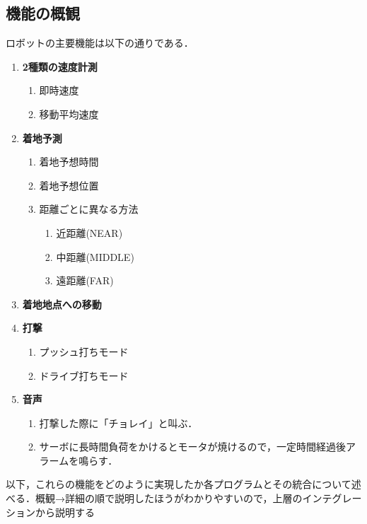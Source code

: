 \documentclass[10pt, oneside, titlepage]{ltjarticle}  %
\begin{document}
  \subsection{機能の概観}
  ロボットの主要機能は以下の通りである．
  \begin{enumerate}
    \item {\bf 2種類の速度計測}
    \begin{enumerate}
      \item 即時速度
      \item 移動平均速度
    \end{enumerate}
    \item {\bf 着地予測}
    \begin{enumerate}
      \item 着地予想時間
      \item 着地予想位置
      \item 距離ごとに異なる方法
      \begin{enumerate}
        \item 近距離(NEAR)
        \item 中距離(MIDDLE)
        \item 遠距離(FAR)
      \end{enumerate}
    \end{enumerate}
    \item {\bf 着地地点への移動}
    \item {\bf 打撃}
    \begin{enumerate}
      \item プッシュ打ちモード
      \item ドライブ打ちモード
    \end{enumerate}
    \item {\bf 音声}
    \begin{enumerate}
      \item 打撃した際に「チョレイ」と叫ぶ．
      \item サーボに長時間負荷をかけるとモータが焼けるので，一定時間経過後アラームを鳴らす．
    \end{enumerate}
  \end{enumerate}

  以下，これらの機能をどのように実現したか各プログラムとその統合について述べる．概観→詳細の順で説明したほうがわかりやすいので，上層のインテグレーションから説明する
\end{document}
